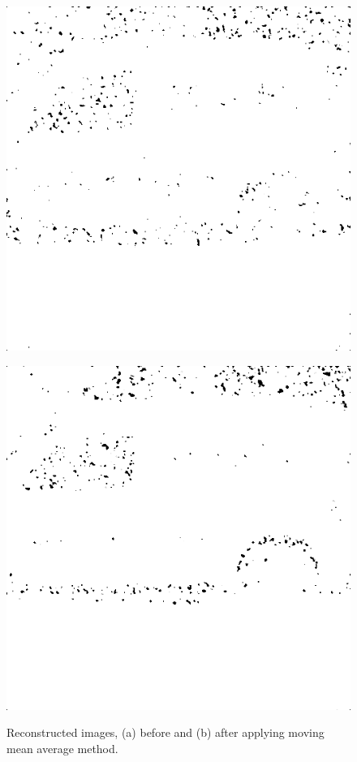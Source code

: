 \begin{figure}[H]
\begin{minipage}[t]{0.49\textwidth}
\includegraphics[width = 1\linewidth]{result/luminance/24_512_m30.PNG}
	\subcaption{}
	\label{lc_bf}
\end{minipage}
\begin{minipage}[t]{0.49\textwidth}
\includegraphics[width = 1\linewidth]{gfx/car/car_m30.png}
	\subcaption{}
	\label{lc_af}
\end{minipage}
	\caption{Reconstructed images, (a) before and (b) after applying moving mean average method.}
	\label{fig:lc_image}
\end{figure}

